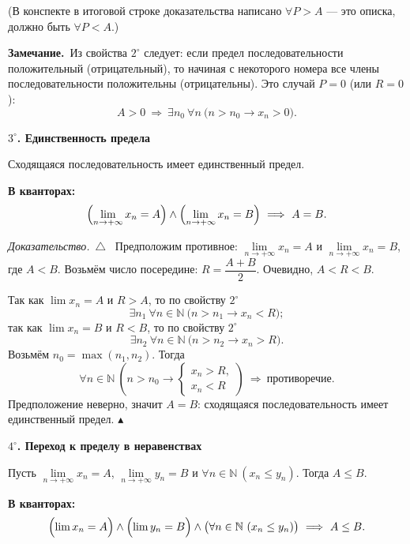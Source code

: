 \documentclass[a4paper,11pt]{article}
\newcommand{\N}{\mathbb{N}}
\newcommand{\kv}{\par\noindent\textbf{\textcolor{oprc!85!black}{В кванторах:}}}
\newcommand{\zam}{\par\smallskip\noindent\textbf{\textcolor{zamc}{Замечание.}}\ }
\newenvironment{dok}
  {\par\smallskip\noindent\textit{Доказательство.}\ $\triangle$\ \ignorespaces}
  {\unskip\nobreak\hfill$\blacktriangle$\par\smallskip}
\newcommand{\podr}[1]{\par\needspace{8\baselineskip}\medskip
  {\large\bfseries\textcolor{oprc!80!black}{#1}}\par\nopagebreak\smallskip}
\begin{document}
{\small\textcolor{zamc}{(В конспекте в итоговой строке доказательства написано $\forall P > A$ --- это описка, должно быть $\forall P < A$.)}}

\zam Из свойства $2^\circ$ следует: если предел последовательности положительный (отрицательный), то начиная
с некоторого номера все члены последовательности положительны (отрицательны). Это случай $P = 0$ (или $R = 0$):
\[
  A > 0 \ \Longrightarrow\ \exists n_0\ \forall n\ \bigl(n > n_0 \to x_n > 0\bigr).
\]

\podr{$3^\circ$. Единственность предела}

\begin{teo}[$3^\circ$]
Сходящаяся последовательность имеет единственный предел.
\kv
\[
  \Bigl(\lim_{n \to +\infty} x_n = A\Bigr) \wedge \Bigl(\lim_{n \to +\infty} x_n = B\Bigr) \ \Longrightarrow\ A = B.
\]
\end{teo}

\begin{dok}
Предположим противное: $\lim\limits_{n \to +\infty} x_n = A$ и $\lim\limits_{n \to +\infty} x_n = B$, где $A < B$.
Возьмём число посередине: $R = \dfrac{A + B}{2}$. Очевидно, $A < R < B$.

Так как $\lim x_n = A$ и $R > A$, то по свойству $2^\circ$
\[
  \exists n_1\ \forall n \in \N\ \bigl(n > n_1 \to x_n < R\bigr);
\]
так как $\lim x_n = B$ и $R < B$, то по свойству $2^\circ$
\[
  \exists n_2\ \forall n \in \N\ \bigl(n > n_2 \to x_n > R\bigr).
\]
Возьмём $n_0 = \max(n_1, n_2)$. Тогда
\[
  \forall n \in \N\ \left(n > n_0 \to
  \begin{cases} x_n > R,\\ x_n < R \end{cases}\right)
  \ \Longrightarrow\ \text{противоречие}.
\]
Предположение неверно, значит $A = B$: сходящаяся последовательность имеет единственный предел.
\end{dok}

\podr{$4^\circ$. Переход к пределу в неравенствах}

\begin{teo}[$4^\circ$]
Пусть $\lim\limits_{n \to +\infty} x_n = A$, $\lim\limits_{n \to +\infty} y_n = B$ и $\forall n \in \N\ (x_n \le y_n)$. Тогда $A \le B$.
\kv
\[
  \Bigl(\lim x_n = A\Bigr) \wedge \Bigl(\lim y_n = B\Bigr) \wedge \bigl(\forall n \in \N\ (x_n \le y_n)\bigr)
  \ \Longrightarrow\ A \le B.
\]
\end{teo}
\end{document}
